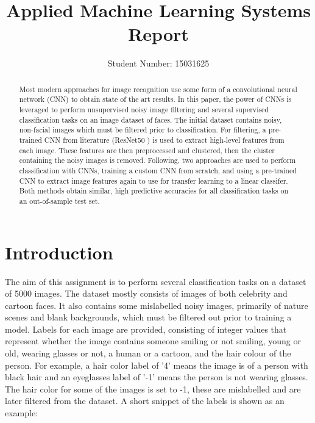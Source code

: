 \documentclass[10pt,twocolumn,letterpaper]{article}
\begin{document}
\title{Applied Machine Learning
Systems Report}

\author{Student Number: 15031625}

\maketitle

\begin{abstract}
   Most modern approaches for image recognition use some form of a convolutional neural network (CNN) to obtain state of the art results. In this paper, the power of CNNs is leveraged to perform unsupervised noisy image filtering and several supervised classification tasks on an image dataset of faces. The initial dataset contains noisy, non-facial images which must be filtered prior to classification. For filtering, a pre-trained CNN from literature (ResNet50 \cite{DBLP:journals/corr/HeZRS15}) is used to extract high-level features from each image. These features are then preprocessed and clustered, then the cluster containing the noisy images is removed. Following, two approaches are used to perform classification with CNNs, training a custom CNN from scratch, and using a pre-trained CNN to extract image features again to use for transfer learning to a linear classifer. Both methods obtain similar, high predictive accuracies for all classification tasks on an out-of-sample test set.
\end{abstract}


\section{Introduction} \label{introduction}

The aim of this assignment is to perform several classification tasks on a dataset of 5000 images. The dataset mostly consists of images of both celebrity and cartoon faces. It also contains some mislabelled noisy images, primarily of nature scenes and blank backgrounds, which must be filtered out prior to training a model. Labels for each image are provided, consisting of integer values that represent whether the image contains someone smiling or not smiling, young or old, wearing glasses or not, a human or a cartoon, and the hair colour of the person. For example, a hair color label of '4' means the image is of a person with black hair and an eyeglasses label of '-1' means the person is not wearing glasses. The hair color for some of the images is set to -1, these are mislabelled and are later filtered from the dataset. A short snippet of the labels is shown as an example:
\vspace{5px}\\
\end{document}
